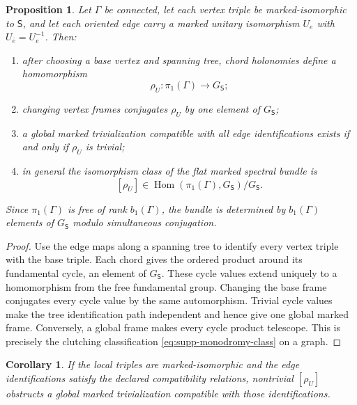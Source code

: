\documentclass[11pt]{article}
\newtheorem{proposition}[proposition]{Proposition}
\newtheorem{corollary}[corollary]{Corollary}
\theoremstyle{definition}
\theoremstyle{remark}
\theoremstyle{definition}
\theoremstyle{remark}
\begin{document}
\begin{proposition}
\label{thm:supp-marked-bundle}
Let $\Gamma$ be connected, let each vertex triple be marked-isomorphic to
$\mathsf S$, and let each oriented edge carry a marked unitary isomorphism
$U_e$ with $U_{\bar e}=U_e^{-1}$.  Then:
\begin{enumerate}[label=\textup{(B\arabic*)},leftmargin=3em]
\item after choosing a base vertex and spanning tree, chord holonomies define a
      homomorphism
      \begin{equation}
       \rho_U:\pi_1(\Gamma)\longrightarrow G_{\mathsf S};
       \label{eq:supp-monodromy}
      \end{equation}
\item changing vertex frames conjugates $\rho_U$ by one element of
      $G_{\mathsf S}$;
\item a global marked trivialization compatible with all edge identifications exists if and only if $\rho_U$ is
      trivial;
\item in general the isomorphism class of the flat marked spectral bundle is
      \begin{equation}
       {
       [\rho_U]\in
       \operatorname{Hom}(\pi_1(\Gamma),G_{\mathsf S})/G_{\mathsf S}.}
       \label{eq:supp-monodromy-class}
      \end{equation}
\end{enumerate}
Since $\pi_1(\Gamma)$ is free of rank $b_1(\Gamma)$, the bundle is determined
by $b_1(\Gamma)$ elements of $G_{\mathsf S}$ modulo simultaneous conjugation.
\end{proposition}

\begin{proof}
Use the edge maps along a spanning tree to identify every vertex triple with
the base triple.  Each chord gives the ordered product around its fundamental
cycle, an element of $G_{\mathsf S}$.  These cycle values extend uniquely to a
homomorphism from the free fundamental group.  Changing the base frame
conjugates every cycle value by the same automorphism.  Trivial cycle values
make the tree identification path independent and hence give one global marked
frame.  Conversely, a global frame makes every cycle product telescope.  This
is precisely the clutching classification
\eqref{eq:supp-monodromy-class} on a graph.
\end{proof}

\begin{corollary}
\label{cor:supp-twisted-bundle}
If the local triples are marked-isomorphic and the edge identifications satisfy the declared compatibility relations, nontrivial $[\rho_U]$ obstructs a global marked trivialization compatible with those identifications.
\end{corollary}
\end{document}
